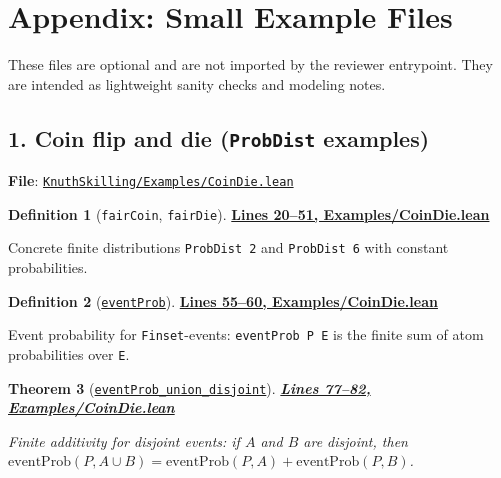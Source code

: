 \documentclass[11pt]{article}
\newtheorem{theorem}{Theorem}[section]
\theoremstyle{definition}
\newtheorem{definition}[theorem]{Definition}
\theoremstyle{remark}
\begin{document}
\section*{Appendix: Small Example Files}
\label{app:examples}

These files are optional and are not imported by the reviewer entrypoint.  They are intended as
lightweight sanity checks and modeling notes.

\subsection*{1. Coin flip and die (\texttt{ProbDist} examples)}

\textbf{File}: \href{https://github.com/zariuq/ks-foundations-of-inference/blob/main/KnuthSkilling/Examples/CoinDie.lean}{\texttt{KnuthSkilling/Examples/CoinDie.lean}}

\begin{definition}[\texttt{fairCoin}, \texttt{fairDie}]
\textbf{\href{https://github.com/zariuq/ks-foundations-of-inference/blob/main/KnuthSkilling/Examples/CoinDie.lean\#L20-L51}{Lines 20--51, Examples/CoinDie.lean}}

Concrete finite distributions \texttt{ProbDist 2} and \texttt{ProbDist 6} with constant probabilities.
\end{definition}

\begin{definition}[\href{https://github.com/zariuq/ks-foundations-of-inference/blob/main/KnuthSkilling/Examples/CoinDie.lean\#L59}{\texttt{eventProb}}]
\textbf{\href{https://github.com/zariuq/ks-foundations-of-inference/blob/main/KnuthSkilling/Examples/CoinDie.lean\#L55-L60}{Lines 55--60, Examples/CoinDie.lean}}

Event probability for \texttt{Finset}-events: \texttt{eventProb P E} is the finite sum of atom
probabilities over \texttt{E}.
\end{definition}

\begin{theorem}[\href{https://github.com/zariuq/ks-foundations-of-inference/blob/main/KnuthSkilling/Examples/CoinDie.lean\#L78}{\texttt{eventProb\_union\_disjoint}}]
\textbf{\href{https://github.com/zariuq/ks-foundations-of-inference/blob/main/KnuthSkilling/Examples/CoinDie.lean\#L77-L82}{Lines 77--82, Examples/CoinDie.lean}}

Finite additivity for disjoint events: if $A$ and $B$ are disjoint, then
$\mathrm{eventProb}(P, A \cup B)=\mathrm{eventProb}(P, A)+\mathrm{eventProb}(P, B)$.
\end{theorem}
\end{document}
